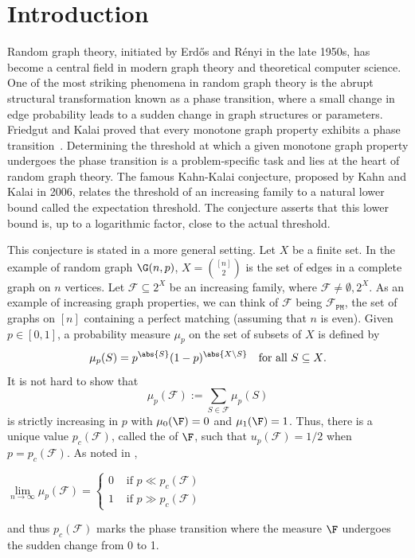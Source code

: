 \documentclass[12pt]{article}
\begin{document}
\section{Introduction}

Random graph theory, initiated by Erd\H{o}s and R\'{e}nyi in the late 1950s, has become a central field in modern graph theory and theoretical computer science. One of the most striking phenomena in random graph theory is the abrupt structural transformation known as a phase transition, where a small change in edge probability leads to a sudden change in graph structures or parameters. 
Friedgut and Kalai proved that every monotone graph property exhibits a phase transition~\cite{Friedgut1996EveryMG}. Determining the threshold at which a given monotone graph property undergoes the phase transition is a problem-specific task  and lies at the heart of random graph theory. The famous Kahn-Kalai conjecture, proposed by Kahn and Kalai in 2006, relates the threshold of an increasing family to a natural lower bound called the expectation threshold. The conjecture asserts that this lower bound is, up to a logarithmic factor, close to the actual threshold.

This conjecture is stated in a more general setting.
Let $X$ be a finite set. In the example of random graph $\G(n,p)$, $X=\binom{[n]}{2}$ is the set of edges in a complete graph on $n$ vertices. Let $\mathcal{F}\subseteq 2^X$ be an increasing family, where $\mathcal{F}\neq\emptyset, 2^X$. As an example of increasing graph properties, we can think of ${\mathcal F}$ being ${\mathcal F}_{\texttt{PM}}$, the set of graphs on $[n]$ containing a perfect matching (assuming that $n$ is even). Given $p\in [0,1]$, a probability measure $\mu_p$ on the set of subsets of $X$ is defined by
\[
\mu_p(S) = p^{\abs{S}}(1-p)^{\abs{X\setminus S}} \quad \text{for all $S\subseteq X$}.
\]
It is not hard to show that
\[
\mu_p(\mathcal{F}) := \sum\limits_{S\in\mathcal{F}} \mu_p(S)
\]
 is strictly increasing in $p$ with $\mu_0(\F)=0$ and $\mu_1(\F)=1$. Thus, there is a unique value $p_c(\mathcal{F})$, called the  of $\F$, such that $u_p(\mathcal{F}) = 1/2$ when $p=p_c(\mathcal{F})$. As noted in \cite{Bollobs1987ThresholdF},
\begin{center}
    $\lim\limits_{n\rightarrow\infty} \mu_p(\mathcal{F}) = \begin{cases} 0 &\text{ if } p\ll p_c(\mathcal{F})\\ 1 &\text{ if } p\gg p_c(\mathcal{F})\end{cases}$
\end{center}
and thus $p_c(\mathcal{F})$ marks the phase transition where the measure $\F$ undergoes the sudden change from 0 to 1.
\end{document}

